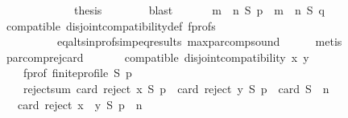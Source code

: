 \begin{isabellebody}
\ \ \ \ \isamarkupfalse%
\ {}{}\ {}{}\isanewline
\ \ \ \ \isamarkupfalse%
\ {\isacharquery}{\kern0pt}thesis\isanewline
\ \ \ \ \ \ \isamarkupfalse%
\ blast\isanewline
\ \ \isamarkupfalse%
\isanewline
\ \ \isamarkupfalse%
\ {\isachardoublequoteopen}{\isacharparenleft}{\kern0pt}m\ {\isasymparallel}\isactrlsub {\isasymup}\ n{\isacharparenright}{\kern0pt}\ S\ p\ {\isacharequal}{\kern0pt}\ {\isacharparenleft}{\kern0pt}m\ {\isasymparallel}\isactrlsub {\isasymup}\ n{\isacharparenright}{\kern0pt}\ S\ q{\isachardoublequoteclose}\isanewline
\ \ \ \ \isamarkupfalse%
\ compatible\ disjoint{\isacharunderscore}{\kern0pt}compatibility{\isacharunderscore}{\kern0pt}def\ f{\isacharunderscore}{\kern0pt}profs\isanewline
\ \ \ \ \ \ \ \ \ \ eq{\isacharunderscore}{\kern0pt}alts{\isacharunderscore}{\kern0pt}in{\isacharunderscore}{\kern0pt}profs{\isacharunderscore}{\kern0pt}imp{\isacharunderscore}{\kern0pt}eq{\isacharunderscore}{\kern0pt}results\ max{\isacharunderscore}{\kern0pt}par{\isacharunderscore}{\kern0pt}comp{\isacharunderscore}{\kern0pt}sound\isanewline
\ \ \ \ \isamarkupfalse%
\ metis\isanewline
{}\isamarkupfalse%
%
\endisatagproof
{\isafoldproof}%
%
\isadelimproof
\isanewline
%
\endisadelimproof
\isanewline
{}\isamarkupfalse%
\ par{\isacharunderscore}{\kern0pt}comp{\isacharunderscore}{\kern0pt}rej{\isacharunderscore}{\kern0pt}card{\isacharcolon}{\kern0pt}\isanewline
\ \ \isanewline
\ \ \ \ compatible{\isacharcolon}{\kern0pt}\ {\isachardoublequoteopen}disjoint{\isacharunderscore}{\kern0pt}compatibility\ x\ y{\isachardoublequoteclose}\ \isanewline
\ \ \ \ f{\isacharunderscore}{\kern0pt}prof{\isacharcolon}{\kern0pt}\ {\isachardoublequoteopen}finite{\isacharunderscore}{\kern0pt}profile\ S\ p{\isachardoublequoteclose}\ \isanewline
\ \ \ \ reject{\isacharunderscore}{\kern0pt}sum{\isacharcolon}{\kern0pt}\ {\isachardoublequoteopen}card\ {\isacharparenleft}{\kern0pt}reject\ x\ S\ p{\isacharparenright}{\kern0pt}\ {\isacharplus}{\kern0pt}\ card\ {\isacharparenleft}{\kern0pt}reject\ y\ S\ p{\isacharparenright}{\kern0pt}\ {\isacharequal}{\kern0pt}\ card\ S\ {\isacharplus}{\kern0pt}\ n{\isachardoublequoteclose}\isanewline
\ \ \ {\isachardoublequoteopen}card\ {\isacharparenleft}{\kern0pt}reject\ {\isacharparenleft}{\kern0pt}x\ {\isasymparallel}\isactrlsub {\isasymup}\ y{\isacharparenright}{\kern0pt}\ S\ p{\isacharparenright}{\kern0pt}\ {\isacharequal}{\kern0pt}\ n{\isachardoublequoteclose}\isanewline

\end{isabellebody}
